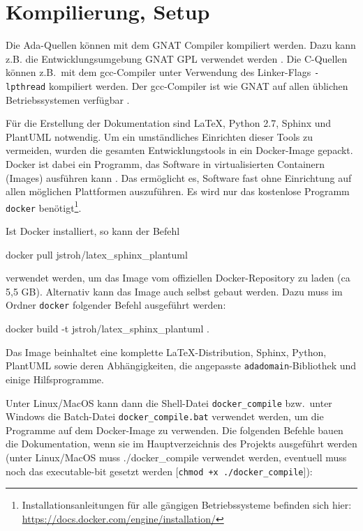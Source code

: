 \documentclass[oneside]{elaboration}
\begin{document}
\section{Kompilierung, Setup}
\label{sec:kompilierung_setup}

Die Ada-Quellen können mit dem GNAT Compiler kompiliert werden. Dazu kann z.B.
die Entwicklungsumgebung GNAT GPL verwendet werden \citep[vgl.][]{GNAT}. Die
C-Quellen können z.B.\ mit dem gcc-Compiler unter Verwendung des Linker-Flags
\texttt{-lpthread} kompiliert werden. Der gcc-Compiler ist wie GNAT auf allen
üblichen Betriebssystemen verfügbar \citep[vgl.][]{GCC}.

Für die Erstellung der Dokumentation sind LaTeX, Python 2.7, Sphinx und PlantUML
notwendig. Um ein umständliches Einrichten dieser Tools zu vermeiden, wurden die
gesamten Entwicklungstools in ein Docker-Image gepackt. Docker ist dabei ein
Programm, das Software in virtualisierten Containern (Images) ausführen kann
\citep[vgl.][]{Docker}. Das ermöglicht es, Software fast ohne Einrichtung auf
allen möglichen Plattformen auszuführen. Es wird nur das kostenlose Programm
\texttt{docker} benötigt\footnote{Installationsanleitungen für alle gängigen
Betriebssysteme befinden sich hier:
\url{https://docs.docker.com/engine/installation/}}.

Ist Docker installiert, so kann der Befehl

\begin{bashcode}
    docker pull jstroh/latex_sphinx_plantuml
\end{bashcode}

verwendet werden, um das Image vom offiziellen Docker-Repository zu laden (ca
5,5 GB). Alternativ kann das Image auch selbst gebaut werden. Dazu muss im
Ordner \texttt{docker} folgender Befehl ausgeführt werden:

\begin{bashcode}
    docker build -t jstroh/latex_sphinx_plantuml .
\end{bashcode}

Das Image beinhaltet eine komplette LaTeX-Distribution, Sphinx, Python, PlantUML
sowie deren Abhängigkeiten, die angepasste \texttt{adadomain}-Bibliothek und
einige Hilfsprogramme. 

Unter Linux/MacOS kann dann die Shell-Datei \texttt{docker\_compile} bzw.\ unter
Windows die Batch-Datei \texttt{docker_compile.bat} verwendet werden, um die
Programme auf dem Docker-Image zu verwenden. Die folgenden Befehle bauen die
Dokumentation, wenn sie im Hauptverzeichnis des Projekts ausgeführt werden
(unter Linux/MacOS muss ./docker\_compile verwendet werden, eventuell muss noch
das executable-bit gesetzt werden [\texttt{chmod +x ./docker\_compile}]):
\end{document}
